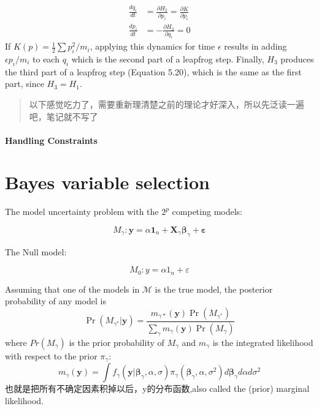 \documentclass[
]{book}
\theoremstyle{definition}
\theoremstyle{definition}
\theoremstyle{definition}
\theoremstyle{remark}
\begin{document}
\[
\begin{aligned} \frac{d q_{i}}{d t} &=\frac{\partial H_{2}}{\partial p_{i}}=\frac{\partial K}{\partial p_{i}} \\ \frac{d p_{i}}{d t} &=-\frac{\partial H_{2}}{\partial q_{i}}=0 \end{aligned}
\]
If \(K(p)=\frac{1}{2}\sum p_i^2/m_i\), applying this dynamics for time \(\epsilon\) results in adding \(\epsilon p_i/m_i\) to each \(q_i\) which is the second part of a leapfrog step. Finally, \(H_3\) produces the third part of a leapfrog step (Equation 5.20), which is the same as the first part, since \(H_3=H_1\).

\begin{quote}
以下感觉吃力了，需要重新理清楚之前的理论才好深入，所以先泛读一遍吧，笔记就不写了
\end{quote}

\hypertarget{handling-constraints}{%
\subsubsection{Handling Constraints}\label{handling-constraints}}

\hypertarget{bayes-variable-selection}{%
\chapter{Bayes variable selection}\label{bayes-variable-selection}}

The model uncertainty problem with the \(2^p\) competing models:

\[
M_{\gamma} : \boldsymbol{y}=\alpha \mathbf{1}_{n}+\boldsymbol{X}_{\gamma} \boldsymbol{\beta}_{\gamma}+\boldsymbol{\varepsilon}
\]

The Null model:

\[
M_{0} : y=\alpha 1_{n}+\varepsilon
\]

Assuming that one of the models in \(\mathcal M\) is the true model, the posterior probability of any model is
\[
\operatorname{Pr}\left(M_{\gamma^{*}} | \boldsymbol{y}\right)=\frac{m_{\gamma *}(\boldsymbol{y}) \operatorname{Pr}\left(M_{\gamma^{*}}\right)}{\sum_{\gamma} m_{\gamma}(\boldsymbol{y}) \operatorname{Pr}\left(M_{\gamma}\right)}
\]
where \(Pr(M_\gamma)\) is the prior probability of \(M_\gamma\) and \(m_\gamma\) is the integrated likelihood with respect to the prior \(\pi_\gamma\):
\[
m_{\gamma}(\boldsymbol{y})=\int f_{\gamma}\left(\boldsymbol{y} | \boldsymbol{\beta}_{\gamma}, \alpha, \sigma\right) \pi_{\gamma}\left(\boldsymbol{\beta}_{\gamma}, \alpha, \sigma^{2}\right) d \boldsymbol{\beta}_{\gamma} d \alpha d \sigma^{2}
\]
也就是把所有不确定因素积掉以后，y的分布函数,also called the (prior) marginal likelihood.
\end{document}
